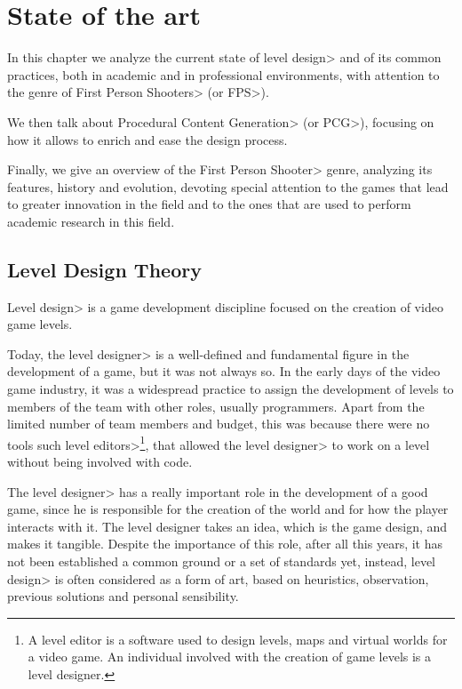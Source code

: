 \chapter{State of the art}


In this chapter we analyze the current state of \<level design> and of its common practices, both in academic and in professional environments, with attention to the genre of \<First Person Shooters> (or \<FPS>).

\par

We then talk about \<Procedural Content Generation> (or \<PCG>), focusing on how it allows to enrich and ease the design process.

\par

Finally, we give an overview of the \<First Person Shooter> genre, analyzing its features, history and evolution, devoting special attention to the games that lead to greater innovation in the field and to the ones that are used to perform academic research in this field.


\section{Level Design Theory}

\<Level design> is a game development discipline focused on the creation of video game levels.

\par

Today, the \<level designer> is a well-defined and fundamental figure in the development of a game, but it was not always so. In the early days of the video game industry, it was a widespread practice to assign the development of levels to members of the team with other roles, usually programmers. Apart from the limited number of team members and budget, this was because there were no tools such \<level editors>\footnote{\label{levelEditorFootnote}A level editor is a software used to design levels, maps and virtual worlds for a video game. An individual involved with the creation of game levels is a level designer.}, that allowed the \<level designer> to work on a level without being involved with code.

\par

The \<level designer> has a really important role in the development of a good game, since he is responsible for the creation of the world and for how the player interacts with it. The level designer takes an idea, which is the game design, and makes it tangible.
Despite the importance of this role, after all this years, it has not been established a common ground or a set of standards yet, instead, \<level design> is often considered as a form of art, based on heuristics, observation, previous solutions and personal sensibility.

